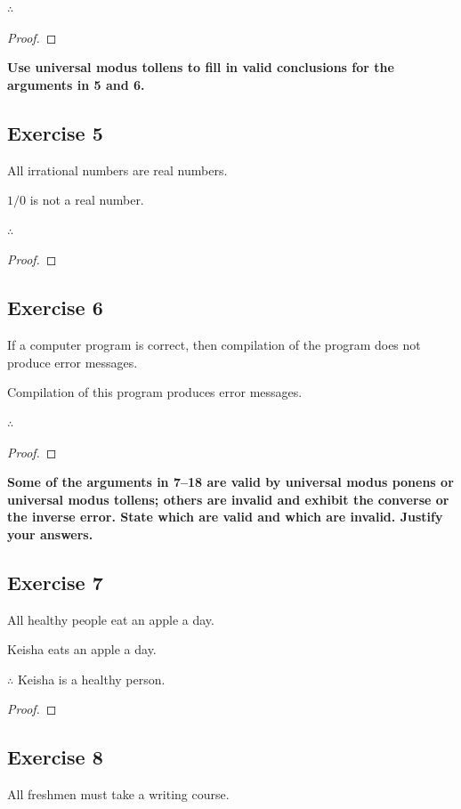\documentclass[14pt]{extarticle}
\newcommand{\fbl}{\underline{\hspace{1cm}}\,\,}
\begin{document}
$\therefore$ \fbl

\begin{proof}

\end{proof}

{\bf \color{cyan} Use universal modus tollens to fill in valid conclusions for the arguments in 5 and 6.}

\subsection{Exercise 5}
All irrational numbers are real numbers.

$1/0$ is not a real number.

$\therefore$ \fbl

\begin{proof}

\end{proof}

\subsection{Exercise 6}
If a computer program is correct, then compilation of the program does not produce error messages.

Compilation of this program produces error messages.

$\therefore$ \fbl

\begin{proof}

\end{proof}

{\bf \color{cyan} Some of the arguments in 7–18 are valid by universal modus ponens or universal modus tollens; others are invalid and exhibit the converse or the inverse error. State which are valid and which are invalid. Justify your answers.}

\subsection{Exercise 7}
All healthy people eat an apple a day.

Keisha eats an apple a day.

$\therefore$ Keisha is a healthy person.

\begin{proof}

\end{proof}

\subsection{Exercise 8}
All freshmen must take a writing course.
\end{document}
